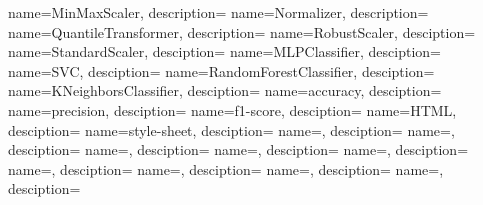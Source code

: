 {
    name={MinMaxScaler},
    description={}
}
{
    name={Normalizer},
    description={}
}
{
    name={QuantileTransformer},
    description={}
}
{
    name={RobustScaler},
    desciption={}
}
{
    name={StandardScaler},
    desciption={}
}
{
    name={MLPClassifier},
    desciption={}
}
{
    name={SVC},
    desciption={}
}
{
    name={RandomForestClassifier},
    desciption={}
}
{
    name={KNeighborsClassifier},
    desciption={}
}
{
    name={accuracy},
    desciption={}
}
{
    name={precision},
    desciption={}
}
{
    name={f1-score},
    desciption={}
}
{
    name={HTML},
    desciption={}
}
{
    name={style-sheet},
    desciption={}
}
\newglossaryentry{}
{
    name={},
    desciption={}
}
\newglossaryentry{}
{
    name={},
    desciption={}
}
\newglossaryentry{}
{
    name={},
    desciption={}
}
\newglossaryentry{}
{
    name={},
    desciption={}
}
\newglossaryentry{}
{
    name={},
    desciption={}
}
\newglossaryentry{}
{
    name={},
    desciption={}
}
\newglossaryentry{}
{
    name={},
    desciption={}
}
\newglossaryentry{}
{
    name={},
    desciption={}
}
\newglossaryentry{}
{
    name={},
    desciption={}
}